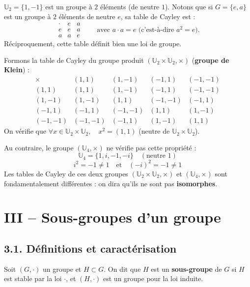 \documentclass[a4paper,11pt]{article}
\newcommand{\U}{\mathbb{U}}
\newcommand{\mot}[1]{\textcolor{bordeaux}{\textbf{#1}}}
\begin{document}
\begin{exemples}
$\U_2 = \{1, -1\}$ est un groupe à $2$ éléments (de neutre $1$).
Notons que si $G = \{e, a\}$ est un groupe à $2$ éléments de neutre $e$, sa table de Cayley est :
\[
\begin{array}{c|cc}
\cdot & e & a \\
\hline
e & e & a \\
a & a & e
\end{array}
\qquad \text{avec } a \cdot a = e \text{ (c'est-à-dire } a^2 = e\text{)}.
\]
Réciproquement, cette table définit bien une loi de groupe.

Formons la table de Cayley du groupe produit $(\U_2 \times \U_2, \times)$ (\mot{groupe de Klein}) :
\[
\begin{array}{c|cccc}
\times & (1, 1) & (1, -1) & (-1, 1) & (-1, -1) \\
\hline
(1, 1) & (1, 1) & (1, -1) & (-1, 1) & (-1, -1) \\
(1, -1) & (1, -1) & (1, 1) & (-1, -1) & (-1, 1) \\
(-1, 1) & (-1, 1) & (-1, -1) & (1, 1) & (1, -1) \\
(-1, -1) & (-1, -1) & (-1, 1) & (1, -1) & (1, 1)
\end{array}
\]
On vérifie que $\forall x \in \U_2 \times \U_2, \quad x^2 = (1, 1)$ (neutre de $\U_2 \times \U_2$).

Au contraire, le groupe $(\U_4, \times)$ ne vérifie pas cette propriété :
\[
\U_4 = \{1, i, -1, -i\} \quad (\text{neutre } 1)
\]
\[
i^2 = -1 \neq 1 \quad \text{et} \quad (-i)^2 = -1 \neq 1
\]
Les tables de Cayley de ces deux groupes $(\U_2 \times \U_2, \times)$ et $(\U_4, \times)$ sont fondamentalement différentes : on dira qu'ils ne sont pas \mot{isomorphes}.
\end{exemples}

\newpage
\section{III -- Sous-groupes d'un groupe}

\subsection{3.1. Définitions et caractérisation}

\begin{definition}
Soit $(G, \cdot)$ un groupe et $H \subset G$. On dit que $H$ est un \mot{sous-groupe} de $G$ si $H$ est stable par la loi $\cdot$, et $(H, \cdot)$ est un groupe pour la loi induite.
\end{definition}
\end{document}
